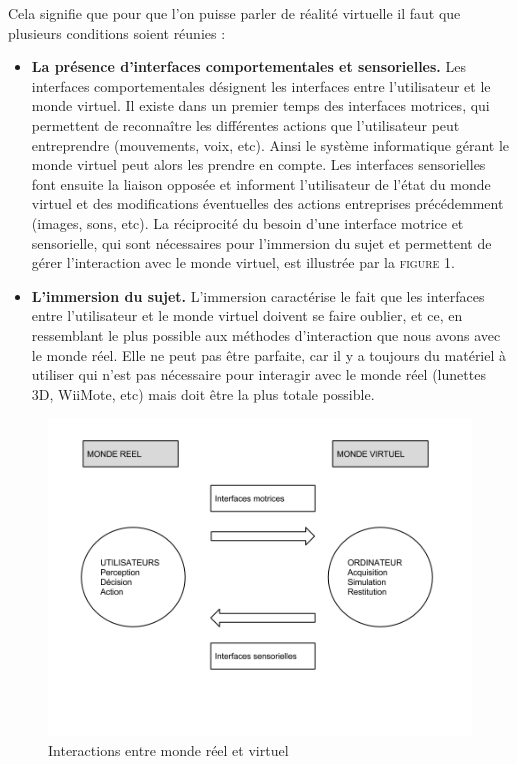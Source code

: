 Cela signifie que pour que l'on puisse parler de réalité virtuelle il faut que plusieurs conditions soient réunies :
\\
\begin{itemize}\renewcommand{\labelitemi}{$\bullet$}
\item \textbf{La présence d'interfaces comportementales et sensorielles. }
Les interfaces comportementales désignent les interfaces entre l'utilisateur et le monde virtuel. Il existe dans un premier temps des interfaces motrices, qui permettent de reconnaître les différentes actions que l'utilisateur peut entreprendre (mouvements, voix, etc). Ainsi le système informatique gérant le monde virtuel peut alors les prendre en compte. Les interfaces sensorielles font ensuite la liaison opposée et informent l'utilisateur de l'état du monde virtuel et des modifications éventuelles des actions entreprises précédemment (images, sons, etc). La réciprocité du besoin d'une interface motrice et sensorielle, qui sont nécessaires pour l'immersion du sujet et permettent de gérer l'interaction avec le monde virtuel, est illustrée par la \textsc{figure 1}.
\item \textbf{L'immersion du sujet.}
L'immersion caractérise le fait que les interfaces entre l'utilisateur et le monde virtuel doivent se faire oublier, et ce, en ressemblant le plus possible aux méthodes d'interaction que nous avons avec le monde réel. Elle ne peut pas être parfaite, car il y a toujours du matériel à utiliser qui n'est pas nécessaire pour interagir avec le monde réel (lunettes 3D, WiiMote, etc) mais doit être la plus totale possible.\\

\end{itemize}
\begin{figure}
  \caption{Interactions entre monde réel et virtuel \cite{traiteRV1}}
  \includegraphics[scale=0.4,bb=0 0 720 720]{1-PreEtude/img/graphe_interfaces.png}
\end{figure}

